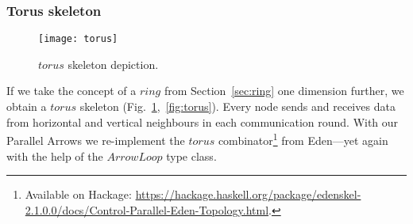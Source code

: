 \documentclass{jfp1}
\newcommand{\Conid}[1]{\mathit{#1}}
\newcommand{\Varid}[1]{\mathit{#1}}
\begin{document}
\subsubsection{Torus skeleton}\label{sec:torus}
\begin{figure}
	\texttt{[image: torus]}
	\caption{\ensuremath{\Varid{torus}} skeleton depiction.}
	\label{fig:ringTorusImg}
\end{figure}
If we take the concept of a \ensuremath{\Varid{ring}} from Section~\ref{sec:ring} one dimension further, we obtain a \ensuremath{\Varid{torus}} skeleton (Fig.~\ref{fig:ringTorusImg},~\ref{fig:torus}). Every node sends and receives data from horizontal and vertical neighbours in each communication round.
With our Parallel Arrows we re-implement the \ensuremath{\Varid{torus}} combinator\footnote{Available on Hackage: \url{https://hackage.haskell.org/package/edenskel-2.1.0.0/docs/Control-Parallel-Eden-Topology.html}.} from Eden---yet again with the help of the \ensuremath{\Conid{ArrowLoop}} type class.
\end{document}
